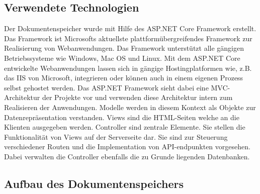 \documentclass[
    fontsize=12pt,
    headings=small,
    parskip=half,           %
    bibliography=totoc,
    numbers=noenddot,       %
    open=any,               %
    ]{scrreprt}
\begin{document}




    \subsection{Verwendete Technologien}
Der Dokumentenspeicher wurde mit Hilfe des ASP.NET Core Framework erstellt. 
Das Framework ist Microsofts aktuellste plattformübergreifendes Framework zur Realisierung von Webanwendungen.
Das Framework unterstützt alle gängigen Betriebssysteme wie Windows, Mac OS und Linux.
Mit dem ASP.NET Core entwickelte Webanwendungen lassen sich in gängige Hostingplatformen wie, z.B. das IIS von Microsoft, integrieren oder können auch in einem eigenen Prozess selbst gehostet werden. 
Das ASP.NET Framework sieht dabei eine MVC-Architektur der Projekte vor und verwenden diese Architektur intern zum Realisieren der Anwendungen. 
Modelle werden in diesem Kontext als Objekte zur Datenrepräsentation verstanden. 
Views sind die HTML-Seiten welche an die Klienten ausgegeben werden.
Controller sind zentrale Elemente. 
Sie stellen die Funktionalität von Views auf der Serverseite dar.
Sie sind zur Steuerung verschiedener Routen und die Implementation von API-endpunkten vorgesehen.
Dabei verwalten die Controller ebenfalls die zu Grunde liegenden Datenbanken.
    \subsection{Aufbau des Dokumentenspeichers}
\end{document}
